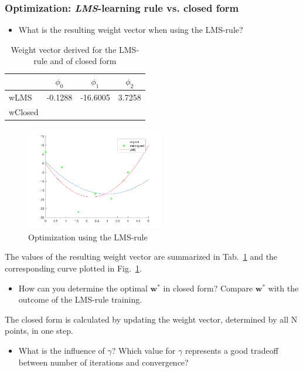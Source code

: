 \documentclass[a4]{article}
\begin{document}
\subsubsection{Optimization: \emph{LMS}-learning rule vs. closed form}
%
%
\begin{itemize}
	\item What is the resulting weight vector when using the LMS-rule?
\end{itemize}
\begin{table} [tbp!]
	\caption{Weight vector derived for the LMS-rule and of closed form}
	\centering
	\label{table:wLMS}
	\begin{tabular}{l c c c}
		\toprule
		& $\phi_0$ & $\phi_1$ & $\phi_2$ \\ 
		\midrule
		wLMS & -0.1288 & -16.6005 & 3.7258 \\ %
		wClosed &  &  &\\
		\bottomrule
	\end{tabular}
\end{table}
\begin{figure}[!h]
	\centering
	\includegraphics[width=6cm]{../figures/LMS.pdf}
	\caption{Optimization using the LMS-rule}
	\label{fig:122_LMS}
\end{figure}
The values of the resulting weight vector are summarized in Tab.~\ref{table:wLMS} and the corresponding curve plotted in Fig.~\ref{fig:122_LMS}.

\begin{itemize}
	\item How can you determine the optimal ${\mathbf w}^*$ in closed form? Compare ${\mathbf w}^*$ with the outcome of the LMS-rule training.
\end{itemize}
The closed form is calculated by updating the weight vector, determined by all N points, in one step.
\begin{itemize}	
	\item What is the influence of $\gamma$? Which value for $\gamma$ represents a good tradeoff between number of iterations and convergence? 
\end{itemize}
\end{document}
